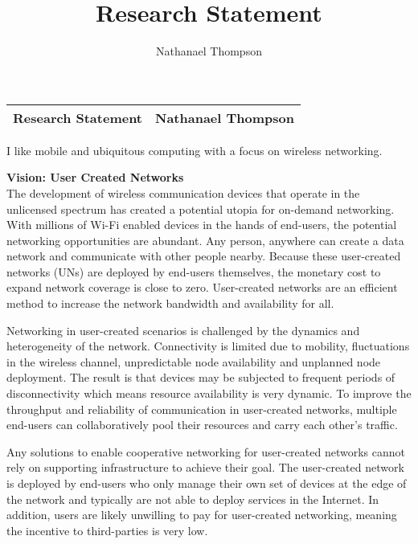 \documentclass[10pt]{article}
\author{Nathanael Thompson}
\title{Research Statement}
\begin{document}
\begin{center}
\begin{tabular}{lr}
\textbf{\Large{Research Statement}} \hfill & \hfill \textbf{\Large{Nathanael Thompson}} \\
\hline
\end{tabular}
\end{center}

I like mobile and ubiquitous computing with a focus on wireless networking.


\noindent \textbf{Vision: User Created Networks} \\
The development of wireless communication devices that operate in the
unlicensed spectrum has created a potential utopia for on-demand networking.
With millions of Wi-Fi enabled devices in the hands of end-users, the
potential networking opportunities are abundant.
Any person, anywhere can create a data network and communicate with other people
nearby.  
Because these user-created networks (UNs) are deployed by end-users themselves,
the monetary cost to
expand network coverage is close to zero.  User-created networks are an
efficient method to increase the network bandwidth and availability
for all.

Networking in user-created scenarios is challenged by the dynamics and
heterogeneity of the network.
Connectivity is limited due to mobility, fluctuations in the
wireless channel, unpredictable
node availability and unplanned node deployment.
The result is that devices may be subjected to frequent periods of
disconnectivity which means resource availability is very dynamic.
To improve the throughput and reliability of communication in user-created
networks, multiple end-users can
collaboratively pool their resources and carry each other's
traffic.



Any solutions to enable cooperative networking for user-created networks
cannot rely on supporting infrastructure to achieve their goal.
The user-created network is deployed by end-users who only manage
their own set of devices at the edge of the network and typically are
not able to deploy services in the Internet.  In addition, users are likely
unwilling to pay for user-created networking, meaning the incentive to
third-parties is very low.
\end{document}
